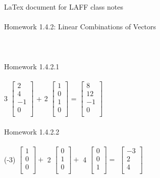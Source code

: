 \documentclass[11pt]{article}
\begin{document}
LaTex document for LAFF class notes
\\
\\
Homework 1.4.2: Linear Combinations of Vectors
\\
\\
\\
\\
Homework 1.4.2.1
\\
\\
3
$
\begin{bmatrix}
{2}\\
{4}\\
{-1}\\
{0}\\
\end{bmatrix}
$
+
2
$
\begin{bmatrix}
{1}\\
{0}\\
{1}\\
{0}\\
\end{bmatrix}
$
=
$
\begin{bmatrix}
{8}\\
{12}\\
{-1}\\
{0}\\
\end{bmatrix}
$
\\
\\
Homework 1.4.2.2
\\
\\
(-3)
$
\begin{bmatrix}
{1}\\
{0}\\
{0}\\
\end{bmatrix}
+
$
2
$
\begin{bmatrix}
{0}\\
{1}\\
{0}\\
\end{bmatrix}
+
$
4
$
\begin{bmatrix}
{0}\\
{0}\\
{1}\\
\end{bmatrix}
=
$
$
\begin{bmatrix}
{-3}\\
{2}\\
{4}\\
\end{bmatrix}
$
\\
\end{document}
